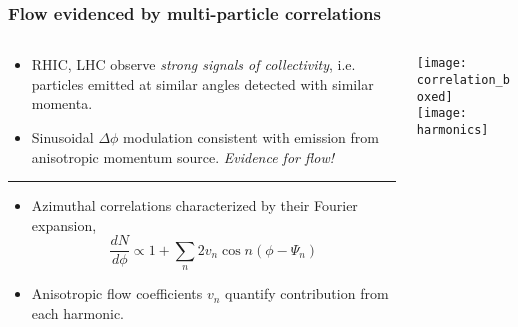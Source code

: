 \documentclass[svgnames]{beamer}
\begin{document}
\begin{frame}
  \frametitle{Flow evidenced by multi-particle correlations}

  \begin{columns}
  \begin{column}{0.6\textwidth}
  
  \begin{itemize}
    \footnotesize
    \item RHIC, LHC observe \emph{strong signals of collectivity}, i.e. particles emitted at similar angles detected with similar momenta.
    \vspace{0.1 in} \\
    \item Sinusoidal $\Delta \phi$ modulation consistent with emission from anisotropic momentum source. \emph{Evidence for flow!}
  \end{itemize}
  
  \vspace{0.15 in}
  \hrule
  \vspace{0.15 in}
  
  \begin{itemize}
    \footnotesize
    \item Azimuthal correlations characterized by their Fourier expansion, \\
    \begin{equation*}
    \frac{dN}{d\phi} \propto 1+\sum_n 2 v_n \cos n(\phi-\Psi_n)
    \end{equation*}
    \item Anisotropic flow coefficients $v_n$ quantify contribution from each harmonic.
  \end{itemize}
  
  \end{column}
  
  \begin{column}{0.4\textwidth}
    \vspace{0.15 in}
    \texttt{[image: correlation\_boxed]}\\
    \vspace{0.1 in}
    \texttt{[image: harmonics]}
  \end{column}
  \end{columns}
  
\end{frame}
\end{document}
